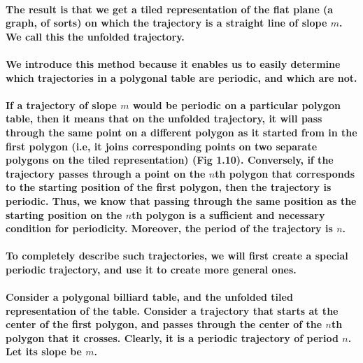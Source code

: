 \documentclass{article}
\begin{document}

\paragraph{The result is that we get a tiled representation of the flat plane (a graph, of sorts) on which the trajectory is a straight line of slope $m$. We call this the unfolded trajectory.}

\paragraph{We introduce this method because it enables us to easily determine which trajectories in a polygonal table are periodic, and which are not.}


\paragraph{If a trajectory of slope $m$ would be periodic on a particular polygon table, then it means that on the unfolded trajectory, it will pass through the same point on a different polygon as it started from in the first polygon (i.e, it joins corresponding points on two separate polygons on the tiled representation) (Fig 1.10). Conversely, if the trajectory passes through a point on the $n$th polygon that corresponds to the starting position of the first polygon, then the trajectory is periodic. Thus, we know that passing through the same position as the starting position on the $n$th polygon is a sufficient and necessary condition for periodicity. Moreover, the period of the trajectory is $n$.}

\paragraph{To completely describe such trajectories, we will first create a special periodic trajectory, and use it to create more general ones.}

\paragraph{Consider a polygonal billiard table, and the unfolded tiled representation of the table. Consider a trajectory that starts at the center of the first polygon, and passes through the center of the $n$th polygon that it crosses. Clearly, it is a periodic trajectory of period $n$. Let its slope be $m$.}
\end{document}
